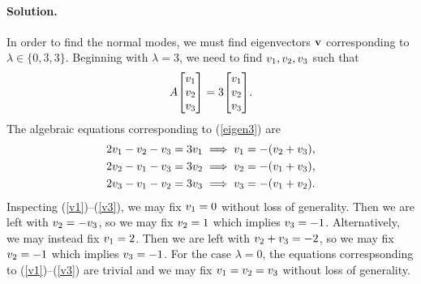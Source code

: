 \documentclass[11pt]{article}
\newcommand{\refeq}[1]{(\ref{#1})}
\newenvironment{solution}
{
    \paragraph{Solution.}
    \ignorespaces
}
{
    \bigskip
}
\begin{document}
\begin{solution}
	In order to find the normal modes, we must find eigenvectors $\mathbf{v}$ corresponding to $\lambda \in \{ 0, 3, 3 \}$.  Beginning with $\lambda = 3$, we need to find $v_1, v_2, v_3$ such that
	\begin{equation} \label{eigen3}
		A \mqty[ \vq \\ \vw \\ \ve ] = 3 \mqty[ \vq \\ \vw \\ \ve ].
	\end{equation}
	The algebraic equations corresponding to \refeq{eigen3} are
	\begin{align}
		2 v_1 - v_2 - v_3 = 3 v_1 &\implies v_1 = -(v_2 + v_3), \label{v1} \\
		2 v_2 - v_1 - v_3 = 3 v_2 &\implies v_2 = -(v_1 + v_3), \label{v2} \\
		2 v_3 - v_1 - v_2 = 3 v_3 &\implies v_3 = -(v_1 + v_2). \label{v3}
	\end{align}
	Inspecting \refeq{v1}--\refeq{v3}, we may fix $v_1 = 0$ without loss of generality.  Then we are left with $v_2 = -v_3$, so we may fix $v_2 = 1$ which implies $v_3 = -1$.  Alternatively, we may instead fix $v_1 = 2$.  Then we are left with $v_2 + v_3 = -2$, so we may fix $v_2 = -1$ which implies $v_3 = -1$.  For the case $\lambda = 0$, the equations correspsonding to \refeq{v1}--\refeq{v3} are trivial and we may fix $v_1 = v_2 = v_3$ without loss of generality.
	

\end{solution}
\end{document}
